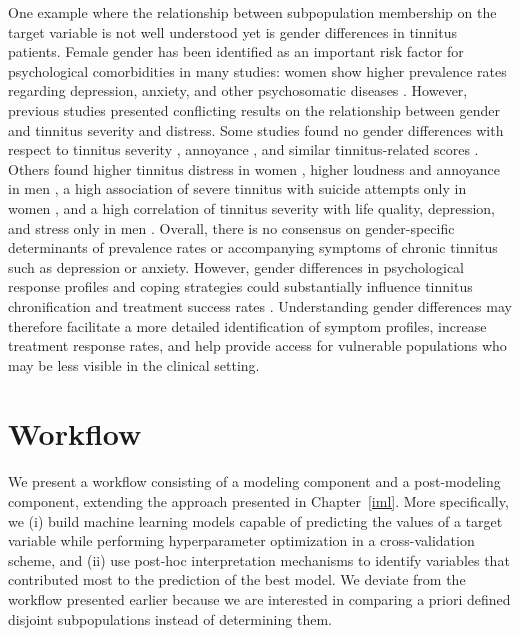 \documentclass[
  oneside]{book}
\begin{document}
One example where the relationship between subpopulation membership on the target variable is not well understood yet is gender differences in tinnitus patients.
Female gender has been identified as an important risk factor for psychological comorbidities in many studies: women show higher prevalence rates regarding depression, anxiety, and other psychosomatic diseases \autocite{Nolen:GenderDepression2001,Piccinelli:GenderDepression2000,Matud:GenderStress2004,Jaussent:GenderInsomnia2011,McLean:GenderAnxiety2011,Asher:GenderAnxiety2017,Langguth:Lancet2013}.
However, previous studies presented conflicting results on the relationship between gender and tinnitus severity and distress.
Some studies found no gender differences with respect to tinnitus severity \autocite{Erlandsson:Gender2001}, annoyance \autocite{Pinto:Gender2010}, and similar tinnitus-related scores \autocite{Meric:Gender1998}.
Others found higher tinnitus distress in women \autocite{Seydel:Gender2013}, higher loudness and annoyance in men \autocite{Hiller:Gender2006}, a high association of severe tinnitus with suicide attempts only in women \autocite{Lugo:Sex2019}, and a high correlation of tinnitus severity with life quality, depression, and stress only in men \autocite{Han:Gender2019}.
Overall, there is no consensus on gender-specific determinants of prevalence rates or accompanying symptoms of chronic tinnitus such as depression or anxiety.
However, gender differences in psychological response profiles and coping strategies could substantially influence tinnitus chronification and treatment success rates \autocite{vanderwal2020}.
Understanding gender differences may therefore facilitate a more detailed identification of symptom profiles, increase treatment response rates, and help provide access for vulnerable populations who may be less visible in the clinical setting.

\hypertarget{gender-workflow}{%
\section{Workflow}\label{gender-workflow}}

We present a workflow consisting of a modeling component and a post-modeling component, extending the approach presented in Chapter~\ref{iml}.
More specifically, we (i) build machine learning models capable of predicting the values of a target variable while performing hyperparameter optimization in a cross-validation scheme, and (ii) use post-hoc interpretation mechanisms to identify variables that contributed most to the prediction of the best model.
We deviate from the workflow presented earlier because we are interested in comparing a priori defined disjoint subpopulations instead of determining them.
\end{document}
